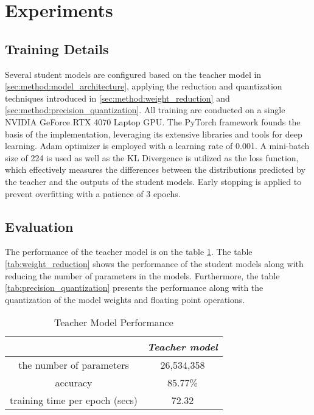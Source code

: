 \section{Experiments}

\subsection{Training Details}

Several student models are configured based on the teacher model in \ref{sec:method:model_architecture}, applying the reduction and quantization techniques
introduced in \ref{sec:method:weight_reduction} and \ref{sec:method:precision_quantization}.
All training are conducted on a single NVIDIA GeForce RTX 4070 Laptop GPU.
The PyTorch \cite{paszke2019pytorch} framework founds the basis of the implementation,
leveraging its extensive libraries and tools for deep learning.
Adam optimizer \cite{kingma2014adam} is employed with a learning rate of 0.001.
A mini-batch size of 224 is used as well as the KL Divergence is utilized as the loss function,
which effectively measures the differences
between the distributions predicted by the teacher and the outputs of the student models.
Early stopping is applied to prevent overfitting with a patience of 3 epochs.

\subsection{Evaluation}

The performance of the teacher model is on the table \ref{tab:teacher_model}.
The table \ref{tab:weight_reduction} shows the performance of the student models
along with reducing the number of parameters in the models.
Furthermore, the table \ref{tab:precision_quantization} presents the performance
along with the quantization of the model weights and floating point operations.

\begin{table}[ht]
\centering
\caption{Teacher Model Performance}
\label{tab:teacher_model}
\begin{tabular}{|c|c|}
    \hline
                            & \textit{Teacher model} \\
    \hline
    the number of parameters & 26,534,358 \\
    \hline
    accuracy                & 85.77\% \\
    \hline
    training time per epoch (secs) & 72.32 \\
    \hline
\end{tabular}
\end{table}

